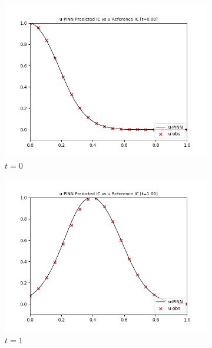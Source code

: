 \documentclass[letterpaper,12pt]{article}
\begin{document}
    \begin{figure}[h]
        \centering
        \begin{subfigure}{0.45\textwidth}
            \includegraphics*[width=\textwidth]{advection_forward_t0.00.png}
            \caption{$t = 0$}
        \end{subfigure}
        \hfill
        \begin{subfigure}{0.45\textwidth}
            \includegraphics*[width=\textwidth]{advection_forward_t1.00.png}
            \caption{$t = 1$}
        \end{subfigure}
        \begin{subfigure}{0.45\textwidth}

\end{subfigure}
\end{figure}
\end{document}
